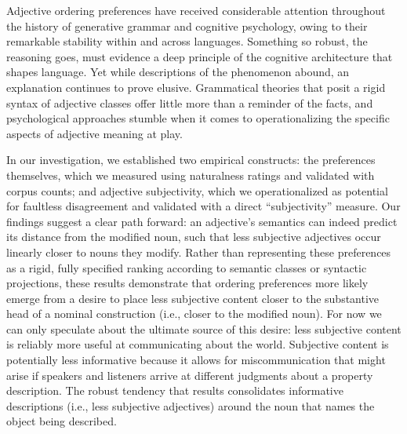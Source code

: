 \documentclass{pnastwo}
\begin{document}
\begin{article}
Adjective ordering preferences have received considerable attention throughout the history of generative grammar and cognitive psychology, owing to their remarkable stability within and across languages. Something so robust, the reasoning goes, must evidence a deep principle of the cognitive architecture that shapes language. Yet while descriptions of the phenomenon abound, an explanation continues to prove elusive. Grammatical theories that posit a rigid syntax of adjective classes offer little more than a reminder of the facts, and psychological approaches stumble when it comes to operationalizing the specific aspects of adjective meaning at play. 

In our investigation, we established two empirical constructs: the preferences themselves, which we measured using naturalness ratings and validated with corpus counts; and adjective subjectivity, which we operationalized as potential for faultless disagreement and validated with a direct ``subjectivity'' measure. Our findings suggest a clear path forward: an adjective's semantics can indeed predict its distance from the modified noun, such that less subjective adjectives occur linearly closer to nouns they modify. Rather than representing these preferences as a rigid, fully specified ranking according to semantic classes or syntactic projections, these results demonstrate that ordering preferences more likely emerge from a desire to place less subjective content closer to the substantive head of a nominal construction (i.e., closer to the modified noun). For now we can only speculate about the ultimate source of this desire: less subjective content is reliably more useful at communicating about the world. Subjective content is potentially less informative because it allows for miscommunication that might arise if speakers and listeners arrive at different judgments about a property description. The robust tendency that results consolidates informative descriptions (i.e., less subjective adjectives) around the noun that names the object being described.


\begin{materials}

\end{materials}
\end{article}
\end{document}
